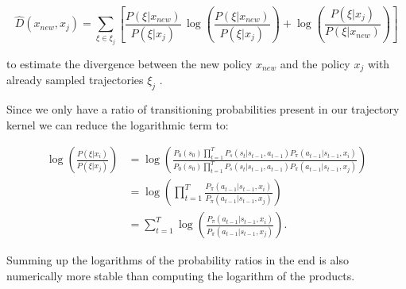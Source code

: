 $$\hat{D}(x_{ new }, x_{ j }) = \sum _{\xi \in \xi_j} \left[\frac{P(\xi|x_{ new })}{P(\xi|x_{ j })}\,\log\left(\frac{P(\xi|x_{new})}{P(\xi|x_{j})}\right)+\log\left(\frac{P(\xi|x_{ j })}{P(\xi|x_{ new })}\right)\right] $$

to estimate the divergence between the new policy $x_{new}$ and the policy $x_j$ with already sampled trajectories $\xi_j$ \cite{wilson2014using}.

Since we only have a ratio of transitioning probabilities present in our trajectory kernel we can reduce the logarithmic term to:

\begin{align*}
    \log\left(\frac{P(\xi|x_i)}{P(\xi|x_j)}\right)
    &= \log\left(\frac{P_{0}(s_{0}) \prod_{t=1}^{T} P_s(s_{t}|s_{t-1},a_{t-1}) P_{\pi}(a_{t-1}|s_{t-1},x_i)}{P_{0}(s_{0}) \prod_{t=1}^{T} P_s(s_{t}|s_{t-1},a_{t-1}) P_{\pi}(a_{t-1}|s_{t-1},x_j)}\right)\\
    &= \log\left(\prod_{t=1}^{T}\frac{ P_{\pi}(a_{t-1}|s_{t-1},x_i)}{P_{\pi}(a_{t-1}|s_{t-1},x_j)}\right)\\
    &= \sum_{t=1}^{T} \log \left(\frac{P_{\pi}(a_{t-1}|s_{t-1},x_i)}{P_{\pi}(a_{t-1}|s_{t-1},x_j)}\right).
\end{align*}

Summing up the logarithms of the probability ratios in the end is also numerically more stable than computing the logarithm of the products.
